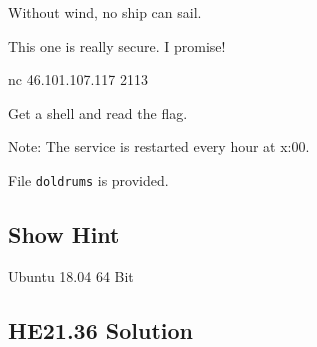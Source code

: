 \documentclass[english,a4paper,nols,noindent]{tufte-handout}
\begin{document}
\noindent Without wind, no ship can sail.

This one is really secure. I promise!

nc 46.101.107.117 2113

Get a shell and read the flag.

Note: The service is restarted every hour at x:00.

File \verb+doldrums+ is provided.

\subsection{Show Hint}
Ubuntu 18.04 64 Bit

\hypertarget{he21.36-solution}{%
\subsection{HE21.36 Solution}\label{he21.36-solution}}

\noindent 
\end{document}
